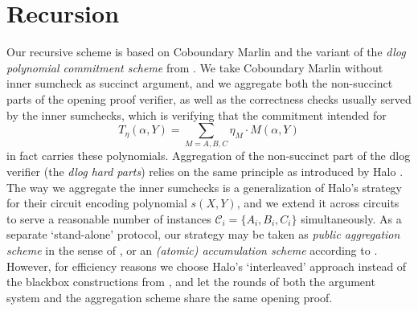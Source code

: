 \documentclass[10pt,article,oneside]{memoir}
\theoremstyle{definition}
\theoremstyle{remark}
\begin{document}
\chapter{Recursion}
\label{s:Amortization}

Our recursive scheme is based on Coboundary Marlin and the \cite{Buenz} variant of the \textit{dlog polynomial commitment scheme} from \cite{BootleGroth}.
We take Coboundary Marlin without inner sumcheck as succinct argument, and we aggregate both the non-succinct parts of the opening proof verifier, as well as the correctness checks usually served by the inner sumchecks, which is verifying that the commitment intended for 
\[
T_\eta(\alpha,Y) = \sum_{M=A,B,C} \eta_M\cdot M (\alpha, Y)
\]
in fact carries these polynomials.
%
Aggregation of the non-succinct part of the dlog verifier (the \textit{dlog hard parts}) relies on the same principle as introduced by Halo \cite{Halo}.
The way we aggregate the inner sumchecks is a generalization of Halo's strategy for their circuit encoding polynomial $s(X,Y)$, and we  extend it across circuits to serve a reasonable number of instances $\mathcal C_i=\{A_i,B_i,C_i\}$ simultaneously.
As a separate `stand-alone' protocol, our strategy may be taken as \textit{public aggregation scheme} in the sense of \cite{HaloInfinite}, or an \textit{(atomic) accumulation scheme} according to \cite{Buenz, PrivateAggregationR1CS}.
%
However, for efficiency reasons we choose Halo's `interleaved' approach instead of the blackbox constructions from  \cite{Buenz, PrivateAggregationR1CS, HaloInfinite}, and let the rounds of both the argument system and the aggregation scheme share the same opening proof.
\end{document}
